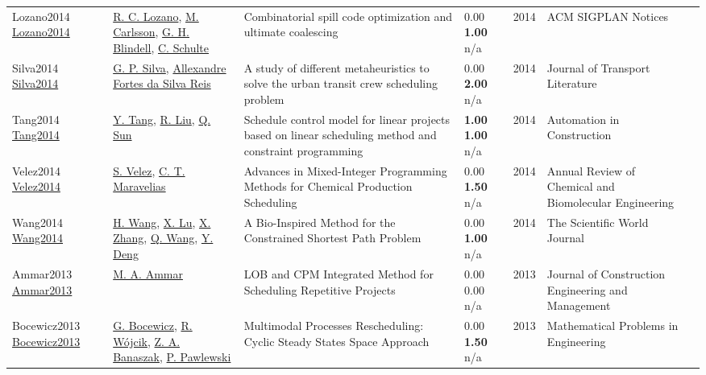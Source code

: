 {\begin{longtable}{p{3cm}p{5cm}p{10cm}p{1cm}rp{2.5cm}l}
Lozano2014 \href{http://dx.doi.org/10.1145/2666357.2597815}{Lozano2014} & \hyperref[auth:a1522]{R. C. Lozano}, \hyperref[auth:a91]{M. Carlsson}, \hyperref[auth:a1523]{G. H. Blindell}, \hyperref[auth:a92]{C. Schulte} & Combinatorial spill code optimization and ultimate coalescing & \noindent{}\textcolor{black!50}{0.00} \textbf{1.00} n/a & 2014 & ACM SIGPLAN Notices & \cite{Lozano2014}\\
Silva2014 \href{http://dx.doi.org/10.1590/2238-1031.jtl.v8n4a9}{Silva2014} & \hyperref[auth:a1888]{G. P. Silva}, \hyperref[auth:a1889]{Allexandre Fortes da Silva Reis} & A study of different metaheuristics to solve the urban transit crew scheduling problem & \noindent{}\textcolor{black!50}{0.00} \textbf{2.00} n/a & 2014 & Journal of Transport Literature & \cite{Silva2014}\\
Tang2014 \href{http://dx.doi.org/10.1016/j.autcon.2013.09.008}{Tang2014} & \hyperref[auth:a555]{Y. Tang}, \hyperref[auth:a556]{R. Liu}, \hyperref[auth:a558]{Q. Sun} & Schedule control model for linear projects based on linear scheduling method and constraint programming & \noindent{}\textbf{1.00} \textbf{1.00} n/a & 2014 & Automation in Construction & \cite{Tang2014}\\
Velez2014 \href{http://dx.doi.org/10.1146/annurev-chembioeng-060713-035859}{Velez2014} & \hyperref[auth:a1480]{S. Velez}, \hyperref[auth:a381]{C. T. Maravelias} & \cellcolor{gold!20}Advances in Mixed-Integer Programming Methods for Chemical Production Scheduling & \noindent{}\textcolor{black!50}{0.00} \textbf{1.50} n/a & 2014 & Annual Review of Chemical and Biomolecular Engineering & \cite{Velez2014}\\
Wang2014 \href{http://dx.doi.org/10.1155/2014/271280}{Wang2014} & \hyperref[auth:a2022]{H. Wang}, \hyperref[auth:a2023]{X. Lu}, \hyperref[auth:a2024]{X. Zhang}, \hyperref[auth:a2025]{Q. Wang}, \hyperref[auth:a2026]{Y. Deng} & \cellcolor{gold!20}A Bio-Inspired Method for the Constrained Shortest Path Problem & \noindent{}\textcolor{black!50}{0.00} \textbf{1.00} n/a & 2014 & The Scientific World Journal & \cite{Wang2014}\\
Ammar2013 \href{http://dx.doi.org/10.1061/(asce)co.1943-7862.0000569}{Ammar2013} & \hyperref[auth:a1779]{M. A. Ammar} & LOB and CPM Integrated Method for Scheduling Repetitive Projects & \noindent{}\textcolor{black!50}{0.00} \textcolor{black!50}{0.00} n/a & 2013 & Journal of Construction Engineering and Management & \cite{Ammar2013}\\
Bocewicz2013 \href{http://dx.doi.org/10.1155/2013/407096}{Bocewicz2013} & \hyperref[auth:a630]{G. Bocewicz}, \hyperref[auth:a1913]{R. Wójcik}, \hyperref[auth:a632]{Z. A. Banaszak}, \hyperref[auth:a1914]{P. Pawlewski} & \cellcolor{gold!20}Multimodal Processes Rescheduling: Cyclic Steady States Space Approach & \noindent{}\textcolor{black!50}{0.00} \textbf{1.50} n/a & 2013 & Mathematical Problems in Engineering & \cite{Bocewicz2013}\\

\end{longtable}}
